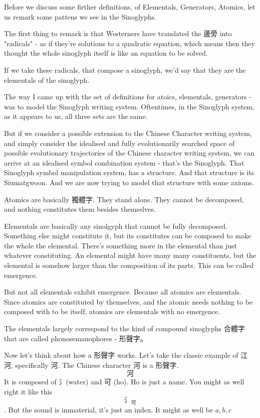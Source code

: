 Before we discuss some firther definitions, of Elementals, Generators, Atomics, let us remark some pattens we see in the Sinoglyphs. 

The first thing to remark is that Westerners have translated the 邊旁 into "radicals" - as if they're solutions to a quadratic equation, which means then they thought the whole sinoglyph itself is like an equation to be solved. 

If we take these radicals, that compose a sinoglyph, we'd say that they are the elementals of the sinoglyph. 

The way I came up with the set of definitions for atoics, elementals, generators - was to model the Sinoglyph writing system. Oftentimes, in the Sinoglyph system, as it appears to us, all three sets are the same. 

But if we consider a possible extension to the Chinese Character writing system, and simply consider the idealised and fully evolutionarily searched space of possible evolutionary trajectories of the Chinese character writing system, we can arrive at an idealised symbol combination system - that's the Sinoglyph. That Sinoglyph symbol manipulation system, has a structure. And that structure is its Siumatgwoon. And we are now trying to model that structure with some axioms. 

Atomics are basically 獨體字. They stand alone. They cannot be decomposed, and nothing constitutes them besides themselves.

Elementals are basically any sinolgyph that cannot be fully decomposed. Something else might constitute it, but its constitutes can be composed to make the whole the elemental. There's something more in the elemental than just whatever constituting. An elemental might have many many constituents, but the elemental is somehow larger than the composition of its parts. This can be called emergence. 

But not all elementals exhibit emergence. Because all atomics are elementals. Since atomics are constituted by themselves, and the atomic needs nothing to be composed with to be itself, atomics are elementals with no emergence. 


The elementals largely correspond to the kind of compound sinoglyphs 合體字 that are called phonosemanophores - 形聲字。 

Now let's think about how a 形聲字 works. Let's take the classic example of 江河, specifically 河. The Chinese character 河 is a 形聲字. 
$$\text{河}$$
It is composed of 氵(water) and 可 (ho). Ho is just a name. You might as well right it like this $$\text{氵}_{\text{可}}$$. But the sound is immaterial, it's just an index. It might as well be $a,b,c$

